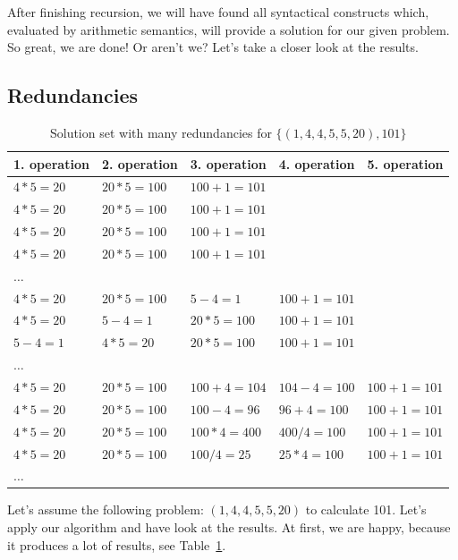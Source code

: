 \documentclass[english]{article}
\begin{document}
After finishing recursion, we will have found all syntactical constructs which, evaluated by arithmetic semantics, will provide a solution for our given problem. So great, we are done! Or aren't we? Let's take a closer look at the results.

\subsection{Redundancies}

\begin{table}
\centering
\begin{tabular}{|l|l|l|l|l|}
	\hline
	1. operation & 2. operation  & 3. operation  & 4. operation  & 5. operation  \\
	\hline
	$4*5=20$ & $20*5=100$ & $100+1=101$ &  &  \\
	\hline
	$4*5=20$ & $20*5=100$ & $100+1=101$ &  &  \\
	\hline
	$4*5=20$ & $20*5=100$ & $100+1=101$ &  &  \\
	\hline
	$4*5=20$ & $20*5=100$ & $100+1=101$ &  &  \\
	\hline
	$\ldots$ &  &  &  &  \\
	\hline
	$4*5=20$ & $20*5=100$ & $5-4=1$ & $100+1=101$ &  \\
	\hline
	$4*5=20$ & $5-4=1$ & $20*5=100$ & $100+1=101$ &  \\
	\hline
	$5-4=1$ & $4*5=20$ & $20*5=100$ & $100+1=101$ &  \\
	\hline
	$\ldots$ &  &  &  &  \\
	\hline
	$4*5=20$ & $20*5=100$ & $100+4=104$ & $104-4=100$ & $100+1=101$ \\
	\hline
	$4*5=20$ & $20*5=100$ & $100-4=96$ & $96+4=100$ & $100+1=101$ \\
	\hline
	$4*5=20$ & $20*5=100$ & $100*4=400$ & $400/4=100$ & $100+1=101$ \\
	\hline
	$4*5=20$ & $20*5=100$ & $100/4=25$ & $25*4=100$ & $100+1=101$ \\
	\hline
	$\ldots$ &  &  &  &  \\
	\hline
\end{tabular}
\caption{\label{table:redundancies} Solution set with many redundancies for $\lbrace \left(1, 4, 4, 5, 5, 20 \right), 101 \rbrace$}
\end{table}

Let's assume the following problem: $\left( 1, 4, 4, 5, 5, 20 \right)$ to calculate 101. Let's apply our algorithm and have look at the results. At first, we are happy, because it produces a lot of results, see Table~\ref{table:redundancies}.
\end{document}
